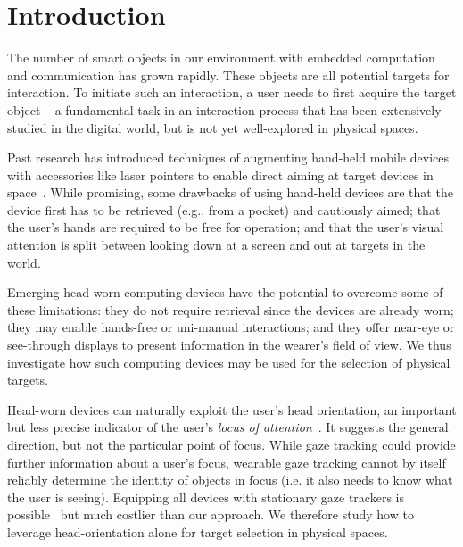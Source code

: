 \section{Introduction}

The number of smart objects in our environment with embedded computation and communication has grown rapidly. These objects are all potential targets for interaction. To initiate such an interaction, a user needs to first acquire the target object -- a fundamental task in an interaction process that has been extensively studied in the digital world, but is not yet well-explored in physical spaces.


Past research has introduced techniques of augmenting hand-held mobile devices with accessories like laser pointers to enable direct aiming at target devices in space~\cite{beigl_point_1999,patel_2-way_2003}. While promising, some drawbacks of using hand-held devices are that the device first has to be retrieved (e.g., from a pocket) and cautiously aimed; that the user's hands are required to be free for operation; and that the user's visual attention is split between looking down at a screen and out at targets in the world. 

Emerging head-worn computing devices have the potential to overcome some of these limitations: they do not require retrieval since the devices are already worn; they may enable hands-free or uni-manual interactions; and they offer near-eye or see-through displays to present information in the wearer's field of view. We thus investigate how such computing devices may be used for the selection of physical targets.

Head-worn devices can naturally exploit the user's head orientation, an important but less precise indicator of the user's {\em locus of attention}~\cite{raskin}. It suggests the general direction, but not the particular point of focus. While gaze tracking could provide further information about a user's focus, wearable gaze tracking cannot by itself reliably determine the identity of objects in focus (i.e. it also needs to know what the user is seeing). Equipping all devices with stationary gaze trackers is possible~\cite{vertegaal2005media} but much costlier than our approach. We therefore study how to leverage head-orientation alone for target selection in physical spaces. 

